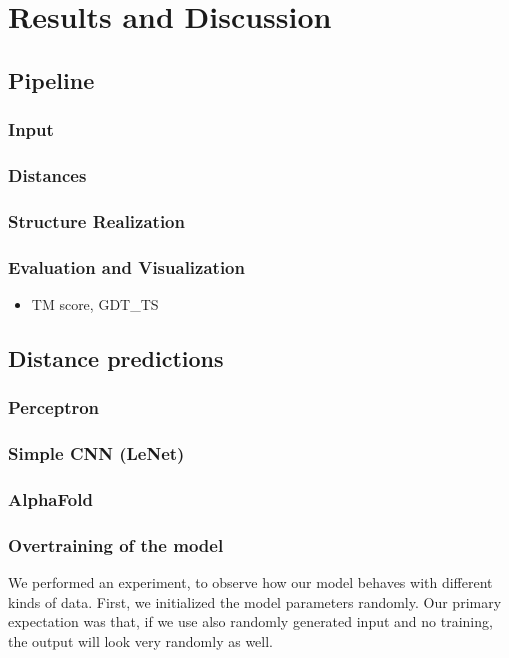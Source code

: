 \chapter{Results and Discussion}

\section{Pipeline}
\subsection{Input}
\subsection{Distances}
\subsection{Structure Realization}
\subsection{Evaluation and Visualization}

\begin{itemize}
    \item TM score, GDT\_TS
\end{itemize}
    
\section{Distance predictions}
\subsection{Perceptron}
\subsection{Simple CNN (LeNet)}
\subsection{AlphaFold}
\subsection{Overtraining of the model}
We performed an experiment, to observe how our model behaves with different kinds of data.
First, we initialized the model parameters randomly.
Our primary expectation was that, if we use also randomly generated input and no training, the output will look very randomly as well.
    
